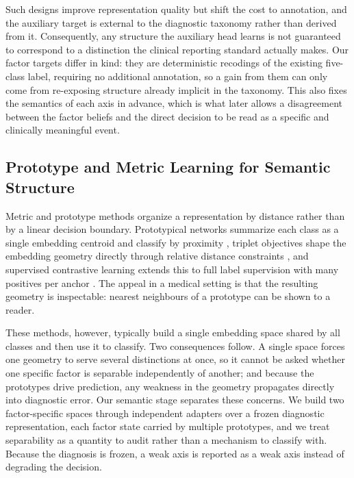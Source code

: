 \documentclass[conference]{IEEEtran}
\begin{document}
Such designs improve representation quality but shift the cost to annotation, and the auxiliary target is external to the diagnostic taxonomy rather than derived from it. Consequently, any structure the auxiliary head learns is not guaranteed to correspond to a distinction the clinical reporting standard actually makes. Our factor targets differ in kind: they are deterministic recodings of the existing five-class label, requiring no additional annotation, so a gain from them can only come from re-exposing structure already implicit in the taxonomy. This also fixes the semantics of each axis in advance, which is what later allows a disagreement between the factor beliefs and the direct decision to be read as a specific and clinically meaningful event.

\subsection{Prototype and Metric Learning for Semantic Structure}
\label{sec:rw_prototype}
Metric and prototype methods organize a representation by distance rather than by a linear decision boundary. Prototypical networks summarize each class as a single embedding centroid and classify by proximity \cite{snell2017prototypical}, triplet objectives shape the embedding geometry directly through relative distance constraints \cite{schroff2015facenet}, and supervised contrastive learning extends this to full label supervision with many positives per anchor \cite{khosla2020supervised}. The appeal in a medical setting is that the resulting geometry is inspectable: nearest neighbours of a prototype can be shown to a reader.

These methods, however, typically build a single embedding space shared by all classes and then use it to classify. Two consequences follow. A single space forces one geometry to serve several distinctions at once, so it cannot be asked whether one specific factor is separable independently of another; and because the prototypes drive prediction, any weakness in the geometry propagates directly into diagnostic error. Our semantic stage separates these concerns. We build two factor-specific spaces through independent adapters over a frozen diagnostic representation, each factor state carried by multiple prototypes, and we treat separability as a quantity to audit rather than a mechanism to classify with. Because the diagnosis is frozen, a weak axis is reported as a weak axis instead of degrading the decision.
\end{document}
